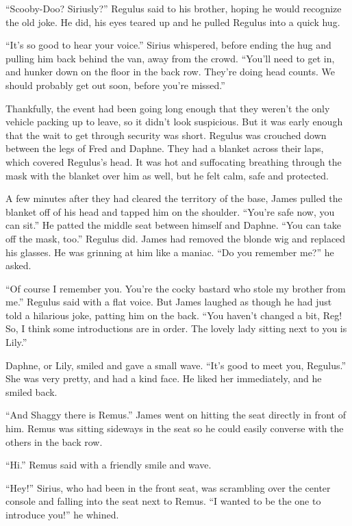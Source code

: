 \documentclass[12pt,twoside,openright]{memoir}
\begin{document}
``Scooby-Doo? Siriusly?'' Regulus said to his brother, hoping he would recognize the old joke. He did, his eyes teared up and he pulled Regulus into a quick hug. 

``It's so good to hear your voice.'' Sirius whispered, before ending the hug and pulling him back behind the van, away from the crowd. ``You'll need to get in, and hunker down on the floor in the back row. They're doing head counts. We should probably get out soon, before you're missed.'' 

Thankfully, the event had been going long enough that they weren't the only vehicle packing up to leave, so it didn't look suspicious. But it was early enough that the wait to get through security was short. Regulus was crouched down between the legs of Fred and Daphne. They had a blanket across their laps, which covered Regulus's head. It was hot and suffocating breathing through the mask with the blanket over him as well, but he felt calm, safe and protected. 

A few minutes after they had cleared the territory of the base, James pulled the blanket off of his head and tapped him on the shoulder. ``You're safe now, you can sit.'' He patted the middle seat between himself and Daphne. ``You can take off the mask, too.'' Regulus did. James had removed the blonde wig and replaced his glasses. He was grinning at him like a maniac. ``Do you remember me?'' he asked.

``Of course I remember you. You're the cocky bastard who stole my brother from me.'' Regulus said with a flat voice. But James laughed as though he had just told a hilarious joke, patting him on the back. ``You haven't changed a bit, Reg! So, I think some introductions are in order. The lovely lady sitting next to you is Lily.'' 

Daphne, or Lily, smiled and gave a small wave. ``It's good to meet you, Regulus.'' She was very pretty, and had a kind face. He liked her immediately, and he smiled back. 

``And Shaggy there is Remus.'' James went on hitting the seat directly in front of him. Remus was sitting sideways in the seat so he could easily converse with the others in the back row. 

``Hi.'' Remus said with a friendly smile and wave. 

``Hey!'' Sirius, who had been in the front seat, was scrambling over the center console and falling into the seat next to Remus. ``I wanted to be the one to introduce you!'' he whined.
\end{document}
